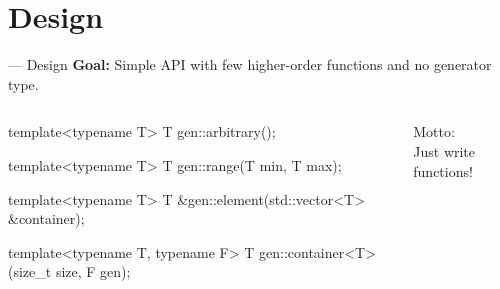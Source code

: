 \section{Design}

\begin{frame}[t,fragile]{\halcheck{} --- Design}
  \textbf{Goal:} Simple API with few higher-order functions and no generator type.\\

  \begin{columns}[onlytextwidth]
    \begin{cppcode}
      template<typename T>
      T gen::arbitrary();

      template<typename T>
      T gen::range(T min, T max);

      template<typename T>
      T &gen::element(std::vector<T> &container);

      template<typename T, typename F>
      T gen::container<T>(size_t size, F gen);
    \end{cppcode}

    \centering\Large Motto:\\\alert{Just write functions!}
  \end{columns}
\end{frame}

